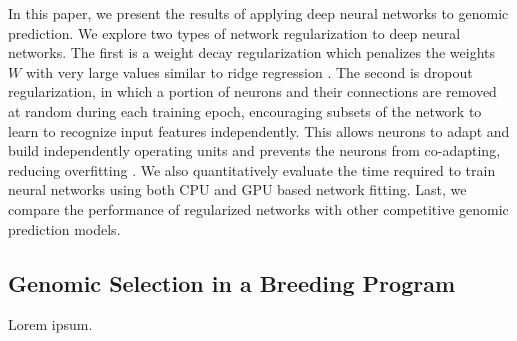 In this paper, we present the results of applying deep neural networks
to genomic prediction. We explore two types of network regularization
to deep neural networks. The first is a weight decay regularization
which penalizes the weights $W$ with very large values 
similar to ridge regression \citep{krogh1992}. The second is dropout 
regularization, in which a portion of neurons and their connections are removed 
at random during each training epoch, encouraging subsets of the network to learn 
to recognize input features independently. This allows neurons to adapt 
and build independently operating units and prevents the 
neurons from co-adapting, reducing overfitting \citep{srivastava2014}.  
We also quantitatively evaluate the time required to train neural networks
using both CPU and GPU based network fitting. Last, we compare the 
performance of regularized networks with other competitive genomic prediction models.


\subsection{Genomic Selection in a Breeding Program}

Lorem ipsum.

